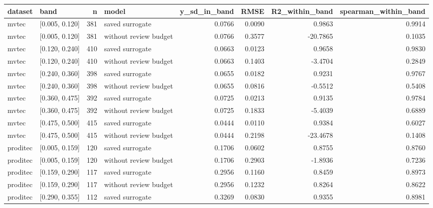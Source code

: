 \begin{tabular}{llrlrrrr}
\toprule
 dataset &           band &   n &                 model &  y\_sd\_in\_band &   RMSE &  R2\_within\_band &  spearman\_within\_band \\
\midrule
   mvtec & [0.005, 0.120] & 381 &       saved surrogate &        0.0766 & 0.0090 &          0.9863 &                0.9914 \\
   mvtec & [0.005, 0.120] & 381 & without review budget &        0.0766 & 0.3577 &        -20.7865 &                0.1035 \\
   mvtec & [0.120, 0.240] & 410 &       saved surrogate &        0.0663 & 0.0123 &          0.9658 &                0.9830 \\
   mvtec & [0.120, 0.240] & 410 & without review budget &        0.0663 & 0.1403 &         -3.4704 &                0.2849 \\
   mvtec & [0.240, 0.360] & 398 &       saved surrogate &        0.0655 & 0.0182 &          0.9231 &                0.9767 \\
   mvtec & [0.240, 0.360] & 398 & without review budget &        0.0655 & 0.0816 &         -0.5512 &                0.5408 \\
   mvtec & [0.360, 0.475] & 392 &       saved surrogate &        0.0725 & 0.0213 &          0.9135 &                0.9784 \\
   mvtec & [0.360, 0.475] & 392 & without review budget &        0.0725 & 0.1833 &         -5.4039 &                0.6889 \\
   mvtec & [0.475, 0.500] & 415 &       saved surrogate &        0.0444 & 0.0110 &          0.9384 &                0.6027 \\
   mvtec & [0.475, 0.500] & 415 & without review budget &        0.0444 & 0.2198 &        -23.4678 &                0.1408 \\
proditec & [0.005, 0.159] & 120 &       saved surrogate &        0.1706 & 0.0602 &          0.8755 &                0.8760 \\
proditec & [0.005, 0.159] & 120 & without review budget &        0.1706 & 0.2903 &         -1.8936 &                0.7236 \\
proditec & [0.159, 0.290] & 117 &       saved surrogate &        0.2956 & 0.1160 &          0.8459 &                0.8973 \\
proditec & [0.159, 0.290] & 117 & without review budget &        0.2956 & 0.1232 &          0.8264 &                0.8622 \\
proditec & [0.290, 0.355] & 112 &       saved surrogate &        0.3269 & 0.0830 &          0.9355 &                0.8981 \\

\end{tabular}

